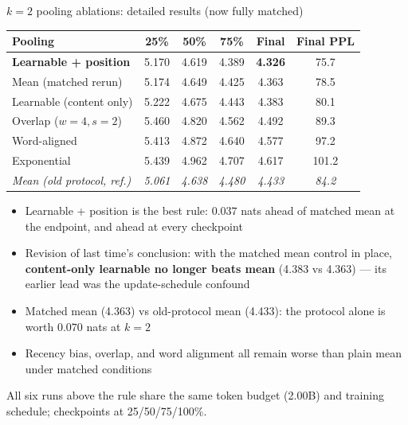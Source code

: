 \documentclass[10pt,aspectratio=169]{beamer}
\newcommand{\good}[1]{\textcolor{okgreen}{#1}}
\newcommand{\bad}[1]{\textcolor{warnred}{#1}}
\begin{document}
\begin{frame}{$k{=}2$ pooling ablations: detailed results (now fully matched)}
  \footnotesize
  \begin{center}
  \begin{tabular}{lccccc}
    \toprule
    Pooling & 25\% & 50\% & 75\% & Final & Final PPL \\
    \midrule
    \good{\textbf{Learnable + position}} & \good{5.170} & \good{4.619} &
      \good{4.389} & \good{\textbf{4.326}} & \good{75.7} \\
    Mean (matched rerun) & 5.174 & 4.649 & 4.425 & 4.363 & 78.5 \\
    Learnable (content only) & 5.222 & 4.675 & 4.443 & 4.383 & 80.1 \\
    Overlap ($w{=}4,s{=}2$) & 5.460 & 4.820 & 4.562 & 4.492 & 89.3 \\
    Word-aligned & 5.413 & 4.872 & 4.640 & 4.577 & 97.2 \\
    Exponential & 5.439 & 4.962 & 4.707 & 4.617 & 101.2 \\
    \midrule
    \textit{Mean (old protocol, ref.)} & \textit{5.061} & \textit{4.638}
      & \textit{4.480} & \textit{4.433} & \textit{84.2} \\
    \bottomrule
  \end{tabular}
  \end{center}

  \vspace{0.3em}
  \begin{itemize}
    \item \good{Learnable + position is the best rule}: $0.037$ nats ahead of
          matched mean at the endpoint, and ahead at every checkpoint
    \item \bad{Revision of last time's conclusion:} with the matched mean
          control in place, \textbf{content-only learnable no longer beats
          mean} (4.383 vs 4.363) --- its earlier lead was the update-schedule
          confound
    \item Matched mean (4.363) vs old-protocol mean (4.433): the protocol
          alone is worth $0.070$ nats at $k{=}2$
    \item Recency bias, overlap, and word alignment all remain worse than
          plain mean under matched conditions
  \end{itemize}

  \vspace{0.1em}
  \scriptsize All six runs above the rule share the same token budget (2.00B)
  and training schedule; checkpoints at 25/50/75/100\%.
\end{frame}
\end{document}
